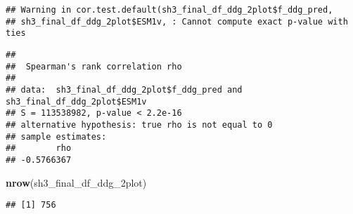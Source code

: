 \documentclass[
]{article}
\newenvironment{Shaded}{\begin{snugshade}}{\end{snugshade}}
\newcommand{\FunctionTok}[1]{\textcolor[rgb]{0.13,0.29,0.53}{\textbf{#1}}}
\newcommand{\NormalTok}[1]{#1}
\begin{document}
\begin{verbatim}
## Warning in cor.test.default(sh3_final_df_ddg_2plot$f_ddg_pred,
## sh3_final_df_ddg_2plot$ESM1v, : Cannot compute exact p-value with ties
\end{verbatim}

\begin{verbatim}
## 
##  Spearman's rank correlation rho
## 
## data:  sh3_final_df_ddg_2plot$f_ddg_pred and sh3_final_df_ddg_2plot$ESM1v
## S = 113538982, p-value < 2.2e-16
## alternative hypothesis: true rho is not equal to 0
## sample estimates:
##        rho 
## -0.5766367
\end{verbatim}

\begin{Shaded}
\begin{Highlighting}[]
\FunctionTok{nrow}\NormalTok{(sh3\_final\_df\_ddg\_2plot)}
\end{Highlighting}
\end{Shaded}

\begin{verbatim}
## [1] 756
\end{verbatim}
\end{document}
